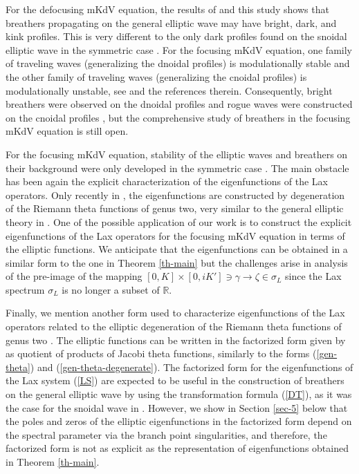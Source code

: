 \documentclass[12pt,reqno]{amsart}
\numberwithin{equation}{section}
\newcommand{\R}{\mathbb{R}}
\begin{document}
For the defocusing mKdV equation, the results of \cite{AP25} and this study shows that breathers propagating on the general elliptic wave may have bright, dark, and kink profiles. This is very different to the only dark profiles found on the snoidal elliptic wave in the symmetric case \cite{MP24}.
For the focusing mKdV equation, one family of traveling waves (generalizing the dnoidal profiles) is modulationally stable and the other family of traveling waves (generalizing the cnoidal profiles) is modulationally unstable, see \cite{Cui} and the references therein. Consequently, bright breathers were observed on the dnoidal profiles \cite{Grava,Minakov} and rogue waves were constructed on the cnoidal 
profiles \cite{CP2018,CP2019}, but the comprehensive study of 
breathers in the focusing mKdV equation is still open.

For the focusing mKdV equation, stability of the elliptic waves and breathers on their background were only developed in the symmetric case \cite{LingSun,LingSun2}. The main obstacle has been again 
the explicit characterization of the eigenfunctions of the Lax operators. Only 
recently in \cite{LingSun3}, the eigenfunctions are constructed by degeneration of the Riemann theta functions of genus two, very similar to the general elliptic theory in \cite{FayBook}. One of the possible application of our work is to construct the explicit eigenfunctions of the Lax operators for the focusing mKdV equation in terms of the elliptic functions. We anticipate that 
the eigenfunctions can be obtained in a similar form to the one in Theorem \ref{th-main} but the challenges arise in analysis of the pre-image of the mapping $[0,K]  \times [0,iK'] \ni \gamma \to \zeta \in \sigma_L$ since the Lax spectrum 
$\sigma_L$ is no longer a subset of $\R$.

Finally, we mention another form used to characterize eigenfunctions 
of the Lax operators related to the elliptic degeneration of the Riemann theta functions of genus two \cite{Geng,Geng3}. The elliptic functions can be written in the factorized form given by as quotient of products of Jacobi theta functions, 
similarly to the forms (\ref{gen-theta}) and (\ref{gen-theta-degenerate}). The factorized form for the eigenfunctions of the Lax system (\ref{LS}) are expected to be useful in the construction of breathers on the general elliptic wave by using the transformation formula (\ref{DT}), as it was the case for the snoidal wave in \cite{MP24}. However, we show in Section \ref{sec-5} below that the poles and zeros of the elliptic eigenfunctions in the factorized form depend on the spectral parameter via the branch point singularities, and therefore, the factorized form is not as explicit as the representation of eigenfunctions obtained in Theorem \ref{th-main}.
\end{document}
